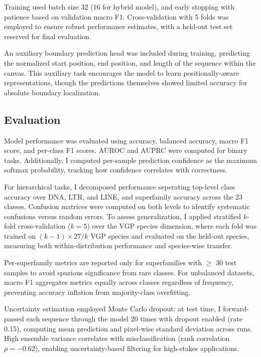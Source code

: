\documentclass[12pt]{article}
\begin{document}
Training used batch size 32 (16 for hybrid model), and early stopping with patience based on validation macro F1. Cross-validation with 5 folds was employed to ensure robust performance estimates, with a held-out test set reserved for final evaluation. 

An auxiliary boundary prediction head was included during training, predicting the normalized start position, end position, and length of the sequence within the canvas. This auxiliary task encourages the model to learn positionally-aware representations, though the predictions themselves showed limited accuracy for absolute boundary localization.

\subsection{Evaluation}

Model performance was evaluated using accuracy, balanced accuracy, macro F1 score, and per-class F1 scores. AUROC and AUPRC were computed for binary tasks. Additionally, I computed per-sample prediction confidence as the maximum softmax probability, tracking how confidence correlates with correctness. 

For hierarchical tasks, I decomposed performance seperating top-level class accuracy over DNA, LTR, and LINE, and superfamily accuracy across the 23 classes. Confusion matrices were computed on both levels to identify systematic confusions versus random errors. To assess generalization, I applied stratified $k$-fold cross-validation ($k=5$) over the VGP species dimension, where each fold was trained on $(k-1) \times 27/k$ VGP species and evaluated on the held-out species, measuring both within-distribution performance and species-wise transfer.

Per-superfamily metrics are reported only for superfamilies with $\geq$ 30 test samples to avoid spurious significance from rare classes. For unbalanced datasets, macro F1 aggregates metrics equally across classes regardless of frequency, preventing accuracy inflation from majority-class overfitting.

Uncertainty estimation employed Monte Carlo dropout: at test time, I forward-passed each sequence through the model 20 times with dropout enabled (rate 0.15), computing mean prediction and pixel-wise standard deviation across runs. High ensemble variance correlates with misclassification (rank correlation $\rho = -0.62$), enabling uncertainty-based filtering for high-stakes applications.
\end{document}
